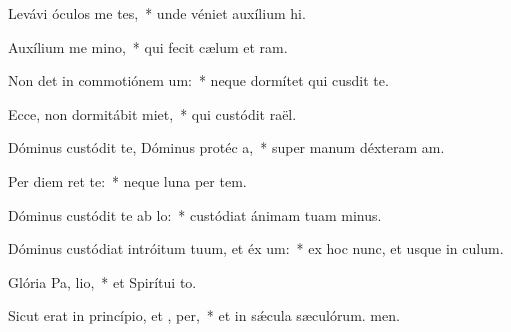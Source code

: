 \item Levávi óculos me  tes,~* unde véniet auxílium hi.
\item Auxílium me  mino,~* qui fecit cælum et ram.
\item Non det in commotiónem  um:~* neque dormítet qui cusdit te.
\item Ecce, non dormitábit  miet,~* qui custódit raël.
\item Dóminus custódit te, Dóminus protéc a,~* super manum déxteram am.
\item Per diem   ret te:~* neque luna per tem.
\item Dóminus custódit te ab  lo:~* custódiat ánimam tuam minus.
\item Dóminus custódiat intróitum tuum, et éx um:~* ex hoc nunc, et usque in culum.
\item Glória Pa,  lio,~* et Spirítui to.
\item Sicut erat in princípio, et ,  per,~* et in sǽcula sæculórum. men.
